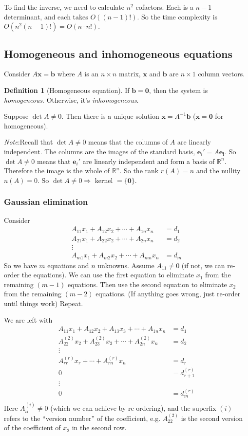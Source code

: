 \documentclass[a4paper]{article}
\theoremstyle{definition}
\newtheorem*{defi}{Definition}
\newcommand{\mb}[1]{\mathbf{#1}}
\newcommand{\note}{\noindent \emph{Note}:\;}
\newcommand{\R}{\mathbb{R}}
\begin{document}
To find the inverse, we need to calculate $n^2$ cofactors. Each is a $n -1$ determinant, and each takes $O((n - 1)!)$. So the time complexity is $O(n^2 (n - 1)!) = O(n\cdot n!)$.

\subsection{Homogeneous and inhomogeneous equations}
Consider $A\mb{x} = \mb{b}$ where $A$ is an $n\times n$ matrix, $\mb{x}$ and $\mb{b}$ are $n\times 1$ column vectors.
\begin{defi}[Homogeneous equation]
  If $\mb{b} = \mb{0}$, then the system is \emph{homogeneous}. Otherwise, it's \emph{inhomogeneous}.
\end{defi}

Suppose $\det A\not= 0$. Then there is a unique solution $\mb{x} = A^{-1}\mb{b}$ ($\mb{x} = \mb{0}$ for homogeneous).

\note Recall that $\det A\not= 0$ means that the columns of $A$ are linearly independent. The columns are the images of the standard basis, $\mb{e}_i' = A\mb{e_i}$. So $\det A\not = 0$ means that $\mb{e}_i'$ are linearly independent and form a basis of $\R^n$. Therefore the image is the whole of $\R^n$. So the rank $r(A) = n$ and the nullity $n(A) = 0$. So $\det A\not= 0\Rightarrow$ kernel $= \{\mb{0}\}$.

\subsubsection{Gaussian elimination}
Consider
\begin{align*}
  A_{11}x_1 + A_{12}x_2 + \cdots + A_{1n}x_n &= d_1\\
  A_{21}x_1 + A_{22}x_2 + \cdots + A_{2n}x_n &= d_2\\
  \vdots&\\
  A_{m1}x_1 + A_{m2}x_2 + \cdots + A_{mn}x_n &= d_m
\end{align*}
So we have $m$ equations and $n$ unknowns.
Assume $A_{11}\not=0$ (if not, we can re-order the equations). We can use the first equation to eliminate $x_1$ from the remaining $(m - 1)$ equations. Then use the second equation to eliminate $x_2$ from the remaining $(m - 2)$ equations. (If anything goes wrong, just re-order until things work) Repeat.

We are left with
\begin{align*}
  A_{11}x_1 + A_{12}x_2 + A_{13}x_3 + \cdots + A_{1n}x_n &= d_1\\
  A_{22}^{(2)}x_2 + A_{23}^{(2)}x_3 + \cdots + A_{2n}^{(2)}x_n &= d_2\\
  \vdots&\\
  A_{rr}^{(r)}x_r + \cdots + A_{rn}^{(r)}x_n &= d_r\\
  0 &= d_{r + 1}^{(r)}\\
  \vdots&\\
  0 &= d_{m}^{(r)}\\
\end{align*}
Here $A_{ii}^{(i)} \not=0$ (which we can achieve by re-ordering), and the superfix $(i)$ refers to the ``version number'' of the coefficient, e.g. $A_{22}^{(2)}$ is the second version of the coefficient of $x_2$ in the second row.
\end{document}
